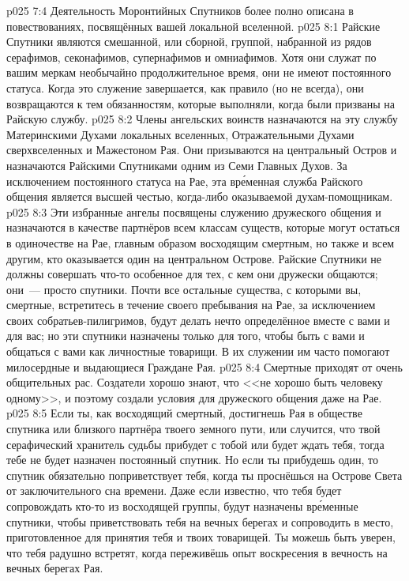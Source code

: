 \vs p025 7:4 Деятельность Моронтийных Спутников более полно описана в повествованиях, посвящённых вашей локальной вселенной.
\vs p025 8:1 Райские Спутники являются смешанной, или сборной, группой, набранной из рядов серафимов, секонафимов, супернафимов и омниафимов. Хотя они служат по вашим меркам необычайно продолжительное время, они не имеют постоянного статуса. Когда это служение завершается, как правило (но не всегда), они возвращаются к тем обязанностям, которые выполняли, когда были призваны на Райскую службу.
\vs p025 8:2 Члены ангельских воинств назначаются на эту службу Материнскими Духами локальных вселенных, Отражательными Духами сверхвселенных и Мажестоном Рая. Они призываются на центральный Остров и назначаются Райскими Спутниками одним из Семи Главных Духов. За исключением постоянного статуса на Рае, эта вр\'еменная служба Райского общения является высшей честью, когда\hyp{}либо оказываемой духам\hyp{}помощникам.
\vs p025 8:3 Эти избранные ангелы посвящены служению дружеского общения и назначаются в качестве партнёров всем классам существ, которые могут остаться в одиночестве на Рае, главным образом восходящим смертным, но также и всем другим, кто оказывается один на центральном Острове. Райские Спутники не должны совершать что\hyp{}то особенное для тех, с кем они дружески общаются; они~--- просто спутники. Почти все остальные существа, с которыми вы, смертные, встретитесь в течение своего пребывания на Рае, за исключением своих собратьев\hyp{}пилигримов, будут делать нечто определённое вместе с вами и для вас; но эти спутники назначены только для того, чтобы быть с вами и общаться с вами как личностные товарищи. В их служении им часто помогают милосердные и выдающиеся Граждане Рая.
\vs p025 8:4 Смертные приходят от очень общительных рас. Создатели хорошо знают, что <<не хорошо быть человеку одному>>, и поэтому создали условия для дружеского общения даже на Рае.
\vs p025 8:5 \pc Если ты, как восходящий смертный, достигнешь Рая в обществе спутника или близкого партнёра твоего земного пути, или случится, что твой серафический хранитель судьбы прибудет с тобой или будет ждать тебя, тогда тебе не будет назначен постоянный спутник. Но если ты прибудешь один, то спутник обязательно поприветствует тебя, когда ты проснёшься на Острове Света от заключительного сна времени. Даже если известно, что тебя будет сопровождать кто\hyp{}то из восходящей группы, будут назначены вр\'еменные спутники, чтобы приветствовать тебя на вечных берегах и сопроводить в место, приготовленное для принятия тебя и твоих товарищей. Ты можешь быть уверен, что тебя радушно встретят, когда переживёшь опыт воскресения в вечность на вечных берегах Рая.
